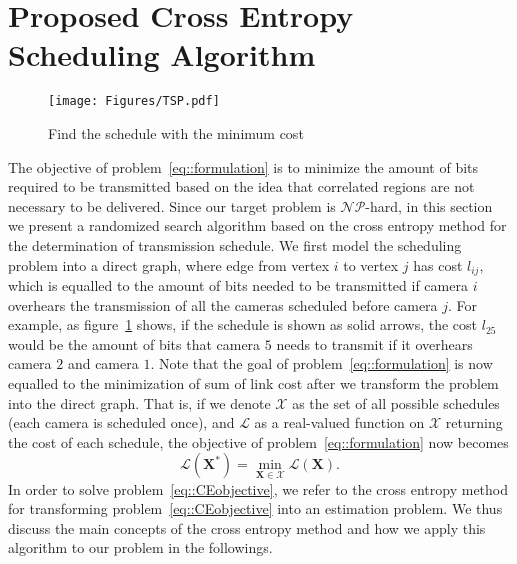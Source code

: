 \section{Proposed Cross Entropy Scheduling Algorithm}
\label{sec::ceAlgorithm}
\begin{figure}
\begin{center}
\texttt{[image: Figures/TSP.pdf]}
\caption{\label{fig::TSP}Find the schedule with the minimum cost}
\end{center}
\end{figure}
The objective of problem~\eqref{eq::formulation} is to minimize the amount of bits required to be transmitted based on the idea that correlated regions are not necessary to be delivered.
Since our target problem is  $\mathcal{NP}$-hard, in this section we present a randomized search algorithm based on the cross entropy method for the determination of transmission schedule.
We first model the scheduling problem into a direct graph, where edge from vertex $i$ to vertex $j$ has cost $l_{ij}$, which is equalled to the amount of bits needed to be transmitted if camera $i$ overhears the transmission of all the cameras scheduled before camera $j$.
For example, as figure~\ref{fig::TSP} shows, if the schedule is shown as solid arrows, the cost $l_{25}$ would be the amount of bits that camera $5$ needs to transmit if it overhears camera $2$ and camera $1$.
Note that the goal of problem~\eqref{eq::formulation} is now equalled to the minimization of sum of link cost after we transform the problem into the direct graph.
That is, if we denote $\mathcal{X}$ as the set of all possible schedules (each camera is scheduled once), and $\mathcal{L}$ as a real-valued function on $\mathcal{X}$ returning the cost of each schedule, the objective of problem~\eqref{eq::formulation} now becomes
\begin{equation}
\mathcal{L}(\mathbf{X}^*) = \underset{\mathbf{X} \in \mathcal{X}}{\min} \mathcal{L}(\mathbf{X}).
\label{eq::CEobjective}
\end{equation}
In order to solve problem~\eqref{eq::CEobjective}, we refer to the cross entropy method for transforming problem~\eqref{eq::CEobjective} into an estimation problem.
We thus discuss the main concepts of the cross entropy method and how we apply this algorithm to our problem in the followings.
%
